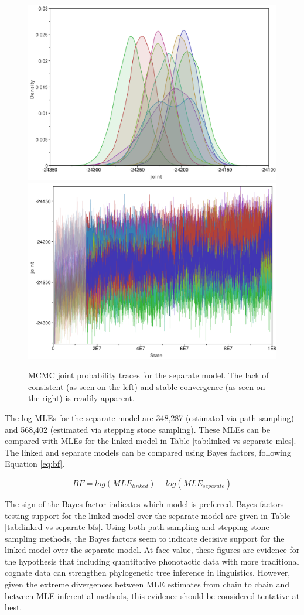 \documentclass[]{article}
\begin{document}
\begin{figure}
\includegraphics[width=0.5\linewidth]{fig/sep_trace_ch1-10} \includegraphics[width=0.5\linewidth]{fig/sep_trace_dens_ch1-10} \caption{MCMC joint probability traces for the separate model. The lack of consistent (as seen on the left) and stable convergence (as seen on the right) is readily apparent.}\label{fig:separate-all-trace}
\end{figure}

The log MLEs for the separate model are 348,287 (estimated via path sampling) and 568,402 (estimated via stepping stone sampling). These MLEs can be compared with MLEs for the linked model in Table \ref{tab:linked-vs-separate-mles}. The linked and separate models can be compared using Bayes factors, following Equation \eqref{eq:bf}.

\begin{equation}
BF = log(MLE_{linked}) - log(MLE_{separate})
\label{eq:bf}
\end{equation}

The sign of the Bayes factor indicates which model is preferred. Bayes factors testing support for the linked model over the separate model are given in Table \ref{tab:linked-vs-separate-bfs}. Using both path sampling and stepping stone sampling methods, the Bayes factors seem to indicate decisive support for the linked model over the separate model. At face value, these figures are evidence for the hypothesis that including quantitative phonotactic data with more traditional cognate data can strengthen phylogenetic tree inference in linguistics. However, given the extreme divergences between MLE estimates from chain to chain and between MLE inferential methods, this evidence should be considered tentative at best.
\end{document}
